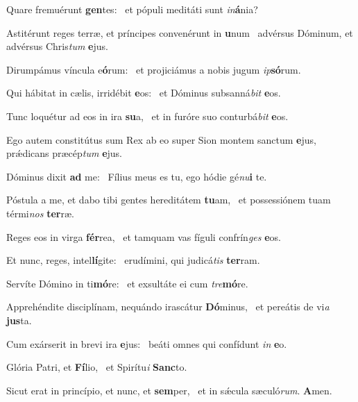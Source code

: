 \item Quare fremuérunt \textbf{gen}tes:~\psstar{} et pópuli meditáti sunt \textit{in}\textbf{á}nia?
\item Astitérunt reges terræ, et príncipes convenérunt in \textbf{u}num~\psstar{} advérsus Dóminum, et advérsus Chris\textit{tum} \textbf{e}jus.
\item Dirumpámus víncula e\textbf{ó}rum:~\psstar{} et projiciámus a nobis jugum \textit{ip}\textbf{só}rum.
\item Qui hábitat in cælis, irridébit \textbf{e}os:~\psstar{} et Dóminus subsanná\textit{bit} \textbf{e}os.
\item Tunc loquétur ad eos in ira \textbf{su}a,~\psstar{} et in furóre suo conturbá\textit{bit} \textbf{e}os.
\item Ego autem constitútus sum Rex ab eo super Sion montem sanctum \textbf{e}jus,~\psstar{} prǽdicans præcép\textit{tum} \textbf{e}jus.
\item Dóminus dixit \textbf{ad} me:~\psstar{} Fílius meus es tu, ego hódie gé\textit{nu}\textbf{i} te.
\item Póstula a me, et dabo tibi gentes hereditátem \textbf{tu}am,~\psstar{} et possessiónem tuam térmi\textit{nos} \textbf{ter}ræ.
\item Reges eos in virga \textbf{fér}rea,~\psstar{} et tamquam vas fíguli confrín\textit{ges} \textbf{e}os.
\item Et nunc, reges, intel\textbf{lí}gite:~\psstar{} erudímini, qui judicá\textit{tis} \textbf{ter}ram.
\item Servíte Dómino in ti\textbf{mó}re:~\psstar{} et exsultáte ei cum \textit{tre}\textbf{mó}re.
\item Apprehéndite disciplínam, nequándo irascátur \textbf{Dó}minus,~\psstar{} et pereátis de vi\textit{a} \textbf{jus}ta.
\item Cum exárserit in brevi ira \textbf{e}jus:~\psstar{} beáti omnes qui confídunt \textit{in} \textbf{e}o.
\item Glória Patri, et \textbf{Fí}lio,~\psstar{} et Spirítu\textit{i} \textbf{Sanc}to.
\item Sicut erat in princípio, et nunc, et \textbf{sem}per,~\psstar{} et in sǽcula sæculó\textit{rum}. \textbf{A}men.
